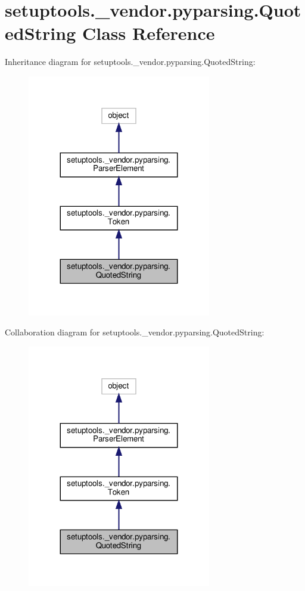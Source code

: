 \hypertarget{classsetuptools_1_1__vendor_1_1pyparsing_1_1QuotedString}{}\section{setuptools.\+\_\+vendor.\+pyparsing.\+Quoted\+String Class Reference}
\label{classsetuptools_1_1__vendor_1_1pyparsing_1_1QuotedString}


Inheritance diagram for setuptools.\+\_\+vendor.\+pyparsing.\+Quoted\+String\+:
\nopagebreak
\begin{figure}[H]
\begin{center}
\leavevmode
\includegraphics[width=227pt]{classsetuptools_1_1__vendor_1_1pyparsing_1_1QuotedString__inherit__graph}
\end{center}
\end{figure}


Collaboration diagram for setuptools.\+\_\+vendor.\+pyparsing.\+Quoted\+String\+:
\nopagebreak
\begin{figure}[H]
\begin{center}
\leavevmode
\includegraphics[width=227pt]{classsetuptools_1_1__vendor_1_1pyparsing_1_1QuotedString__coll__graph}
\end{center}
\end{figure}
